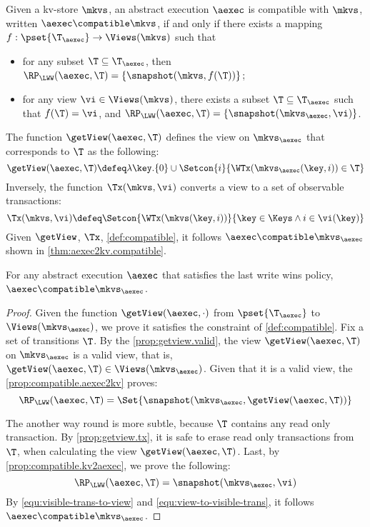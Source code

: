 \begin{definition}
\label{def:compatible}
Given a kv-store $\mkvs$,
an abstract execution $\aexec$ is compatible with $\mkvs$, written 
$\aexec \compatible \mkvs$, if and only if there exists a  mapping 
$f: \pset{\T_{\aexec}} \rightarrow \Views(\mkvs)$
such that  
\begin{itemize}
\item for any subset $\T \subseteq \T_{\aexec}$, then $\RP_{\LWW}(\aexec, \T) = \{\snapshot(\mkvs, f(\T))\}$; 
\item for any view $\vi \in \Views(\mkvs)$, there exists a subset $\T \subseteq \T_{\aexec}$ 
such that $f(\T) = \vi$, and $\RP_{\LWW}(\aexec, \T) = \{\snapshot(\mkvs_{\aexec}, \vi)\}$.
\end{itemize}
\end{definition}

The function $\getView(\aexec, \T)$ defines the view on \( \mkvs_\aexec \) that corresponds to \( \T \) as the following:
\[
    \getView(\aexec, \T) \defeq \lambda \key. \{0\} \cup \Setcon{ i }{\WTx(\mkvs_{\aexec}(\key, i)) \in \T}
\]
Inversely, the function \( \Tx(\mkvs, \vi) \) converts a view to a set of observable transactions:
\[
\Tx(\mkvs, \vi) \defeq \Setcon{ \WTx(\mkvs(\key, i)) }{ \key \in \Keys \wedge i \in \vi(\key) }
\]
Given \( \getView \), \( \Tx \), \cref{def:compatible}, 
it follows \( \aexec \compatible \mkvs_{\aexec} \) shown in \cref{thm:aexec2kv.compatible}.

\begin{theorem}
\label{thm:aexec2kv.compatible}
For any abstract execution $\aexec$ that satisfies the last write wins policy, $\aexec \compatible \mkvs_{\aexec}$.
\end{theorem}
\begin{proof}
Given the function $\getView(\aexec, \cdot )$ from $\pset{\T_{\aexec}}$ to $\Views(\mkvs_{\aexec})$,
we prove it satisfies the constraint of \cref{def:compatible}.
Fix a set of transitions \( \T \).
By the \cref{prop:getview.valid}, the view $\getView(\aexec, \T )$  on \( \mkvs_\aexec \) is a valid view,
that is, \( \getView(\aexec, \T ) \in \Views(\mkvs_\aexec) \).
Given that it is a valid view, the \cref{prop:compatible.aexec2kv} proves:
\begin{equation}
    \label{equ:visible-trans-to-view}
    \RP_{\LWW}(\aexec, \T) = \Set{\snapshot(\mkvs_{\aexec}, \getView(\aexec, \T))} 
\end{equation}

The another way round is more subtle,
because \( \T \) contains any read only transaction.
By \cref{prop:getview.tx}, it is safe to erase read only transactions from \( \T \),
when calculating the view \( \getView(\aexec, \T ) \).
Last, by \cref{prop:compatible.kv2aexec}, we prove the following:
\begin{equation}
    \label{equ:view-to-visible-trans}
    \RP_{\LWW}(\aexec, \T) = \snapshot(\mkvs_{\aexec}, \vi)
\end{equation}
By \cref{equ:visible-trans-to-view} and \cref{equ:view-to-visible-trans},
it follows \( \aexec \compatible \mkvs_{\aexec} \).
\end{proof}

